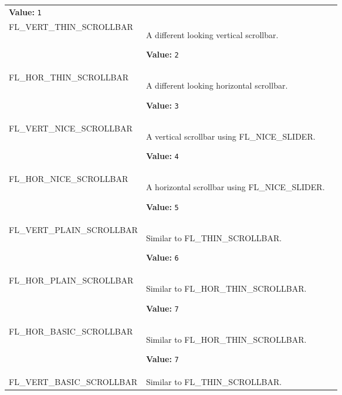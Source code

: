 \begin{longtable}{|p{\varnamewidth}|p{\vardescrwidth}|l}
\textbf{Value:} 
{\tt 1}&\\
\cline{1-2}
\raggedright F\-L\-\_\-V\-E\-R\-T\-\_\-T\-H\-I\-N\-\_\-S\-C\-R\-O\-L\-L\-B\-A\-R\- & \raggedright A different looking vertical scrollbar.

\textbf{Value:} 
{\tt 2}&\\
\cline{1-2}
\raggedright F\-L\-\_\-H\-O\-R\-\_\-T\-H\-I\-N\-\_\-S\-C\-R\-O\-L\-L\-B\-A\-R\- & \raggedright A different looking horizontal scrollbar.

\textbf{Value:} 
{\tt 3}&\\
\cline{1-2}
\raggedright F\-L\-\_\-V\-E\-R\-T\-\_\-N\-I\-C\-E\-\_\-S\-C\-R\-O\-L\-L\-B\-A\-R\- & \raggedright A vertical scrollbar using FL\_NICE\_SLIDER.

\textbf{Value:} 
{\tt 4}&\\
\cline{1-2}
\raggedright F\-L\-\_\-H\-O\-R\-\_\-N\-I\-C\-E\-\_\-S\-C\-R\-O\-L\-L\-B\-A\-R\- & \raggedright A horizontal scrollbar using FL\_NICE\_SLIDER.

\textbf{Value:} 
{\tt 5}&\\
\cline{1-2}
\raggedright F\-L\-\_\-V\-E\-R\-T\-\_\-P\-L\-A\-I\-N\-\_\-S\-C\-R\-O\-L\-L\-B\-A\-R\- & \raggedright Similar to FL\_THIN\_SCROLLBAR.

\textbf{Value:} 
{\tt 6}&\\
\cline{1-2}
\raggedright F\-L\-\_\-H\-O\-R\-\_\-P\-L\-A\-I\-N\-\_\-S\-C\-R\-O\-L\-L\-B\-A\-R\- & \raggedright Similar to FL\_HOR\_THIN\_SCROLLBAR.

\textbf{Value:} 
{\tt 7}&\\
\cline{1-2}
\raggedright F\-L\-\_\-H\-O\-R\-\_\-B\-A\-S\-I\-C\-\_\-S\-C\-R\-O\-L\-L\-B\-A\-R\- & \raggedright Similar to FL\_HOR\_THIN\_SCROLLBAR.

\textbf{Value:} 
{\tt 7}&\\
\cline{1-2}
\raggedright F\-L\-\_\-V\-E\-R\-T\-\_\-B\-A\-S\-I\-C\-\_\-S\-C\-R\-O\-L\-L\-B\-A\-R\- & \raggedright Similar to FL\_THIN\_SCROLLBAR.


\end{longtable}

